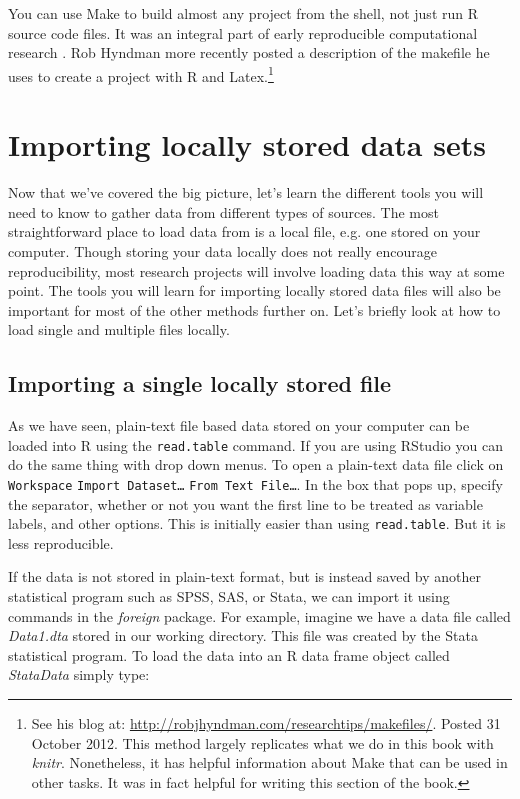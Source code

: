 You can use Make to build almost any project from the shell, not just run R source code files. It was an integral part of early reproducible computational research \citep{Fomel2009, Buckheit1995}. Rob Hyndman more recently posted a description of the makefile he uses to create a project with R and Latex.\footnote{See his blog at: \url{http://robjhyndman.com/researchtips/makefiles/}. Posted 31 October 2012. This method largely replicates what we do in this book with \emph{knitr}. Nonetheless, it has helpful information about Make that can be used in other tasks. It was in fact helpful for writing this section of the book.}

\section{Importing locally stored data sets}

Now that we've covered the big picture, let's learn the different tools you will need to know to gather data from different types of sources. The most straightforward place to load data from is a local file, e.g. one stored on your computer. Though storing your data locally does not really encourage reproducibility, most research projects will involve loading data this way at some point. The tools you will learn for importing locally stored data files will also be important for most of the other methods further on. Let's briefly look at how to load single and multiple files locally.

\subsection{Importing a single locally stored file}

As we have seen, plain-text file based data stored on your computer can be loaded into R using the \texttt{read.table} command. If you are using RStudio you can do the same thing with drop down menus. To open a plain-text data file click on \texttt{Workspace} \textrightarrow\: \texttt{Import Dataset\ldots} \textrightarrow\: \texttt{From Text File\ldots}. In the box that pops up, specify the separator, whether or not you want the first line to be treated as variable labels, and other options. This is initially easier than using \texttt{read.table}. But it is less reproducible.

If the data is not stored in plain-text format, but is instead saved by another statistical program such as SPSS, SAS, or Stata, we can import it using commands in the \emph{foreign} package. For example, imagine we have a data file called \emph{Data1.dta} stored in our working directory. This file was created by the Stata statistical program. To load the data into an R data frame object called \emph{StataData} simply type:

